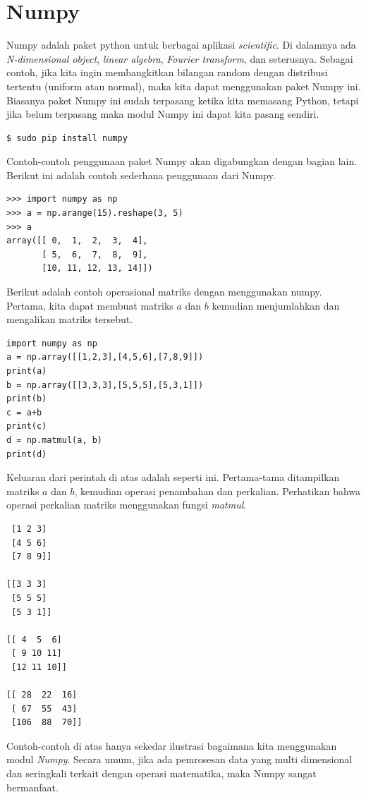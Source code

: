 \section{Numpy}
Numpy adalah paket python untuk berbagai aplikasi {\em scientific}.
Di dalamnya ada {\em N-dimensional object}, {\em linear algebra},
{\em Fourier transform}, dan seterusnya.
Sebagai contoh, jika kita ingin membangkitkan bilangan random dengan 
distribusi tertentu (uniform atau normal), maka kita dapat menggunakan 
paket Numpy ini.
Biasanya paket Numpy ini sudah terpasang ketika kita memasang Python,
tetapi jika belum terpasang maka modul Numpy ini dapat kita pasang sendiri.

\begin{verbatim}
$ sudo pip install numpy
\end{verbatim}

Contoh-contoh penggunaan paket Numpy akan digabungkan dengan bagian lain.
Berikut ini adalah contoh sederhana penggunaan dari Numpy.

\begin{verbatim}
>>> import numpy as np
>>> a = np.arange(15).reshape(3, 5)
>>> a
array([[ 0,  1,  2,  3,  4],
       [ 5,  6,  7,  8,  9],
       [10, 11, 12, 13, 14]])
\end{verbatim}

Berikut adalah contoh operasional matriks dengan menggunakan numpy.
Pertama, kita dapat membuat matriks $a$ dan $b$ kemudian menjumlahkan
dan mengalikan matriks tersebut.

\begin{verbatim}
import numpy as np
a = np.array([[1,2,3],[4,5,6],[7,8,9]])
print(a)
b = np.array([[3,3,3],[5,5,5],[5,3,1]])
print(b)
c = a+b
print(c)
d = np.matmul(a, b)
print(d)
\end{verbatim}

Keluaran dari perintah di atas adalah seperti ini. Pertama-tama ditampilkan
matriks $a$ dan $b$, kemudian operasi penambahan dan perkalian.
Perhatikan bahwa operasi perkalian matriks menggunakan fungsi {\em matmul}.
\begin{verbatim}
 [1 2 3]
 [4 5 6]
 [7 8 9]]

[[3 3 3]
 [5 5 5]
 [5 3 1]]

[[ 4  5  6]
 [ 9 10 11]
 [12 11 10]]

[[ 28  22  16]
 [ 67  55  43]
 [106  88  70]]
\end{verbatim}

Contoh-contoh di atas hanya sekedar ilustrasi bagaimana kita menggunakan
modul {\em Numpy}. Secara umum, jika ada pemrosesan data yang multi dimensional
dan seringkali terkait dengan operasi matematika, maka Numpy
sangat bermanfaat.

